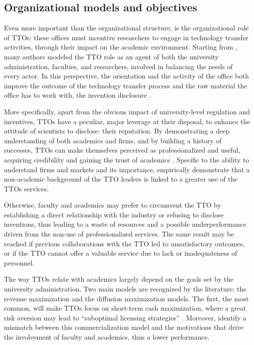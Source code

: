 \subsection{Organizational models and objectives}

Even more important than the organizational structure, is the organizational role of TTOs: these offices must incentive researchers to engage in technology transfer activities, through their impact on the academic environment. Starting from \citet{Jensen1998}, many authors modeled the TTO role as an agent of both the university administration, faculties, and researchers, involved in balancing the needs of every actor. In this perspective, the orientation and the activity of the office both improve the outcome of the technology transfer process and the raw material the office has to work with, the invention disclosure \citep{Siegel2007}. 

More specifically, apart from the obvious impact of university-level regulation and incentives, TTOs have a peculiar, major leverage at their disposal, to enhance the attitude of scientists to disclose: their reputation. By demonstrating a deep understanding of both academics and firms, and by building a history of successes, TTOs can make themselves perceived as professionalized and useful, acquiring credibility and gaining the trust of academics \citep{OwenSmith2001}. Specific to the ability to understand firms and markets and its importance, \citet{Muscio2010} empirically demonstrate that a non-academic background of the TTO leaders is linked to a greater use of the TTOs services.

Otherwise, faculty and academics may prefer to circumvent the TTO by establishing a direct relationship with the industry or refusing to disclose inventions, thus leading to a waste of resources and a possible underperformance driven from the non-use of professionalized services. The same result may be reached if previous collaborations with the TTO  led to unsatisfactory outcomes, or if the TTO cannot offer a valuable service due to lack or inadequateness of personnel. 

The way TTOs relate with academics largely depend on the goals set by the university administration. Two main models are recognized by the literature: the revenue maximization and the diffusion maximization models. The first, the most common, will make TTOs focus on short-term cash maximization, where a great risk aversion may lead to \enquote{suboptimal licensing strategies} \citep{Markman2005}. Moreover, \citet{Siegel2003} identify a mismatch between this commercialization model and the motivations that drive the involvement of faculty and academics, thus a lower performance.


